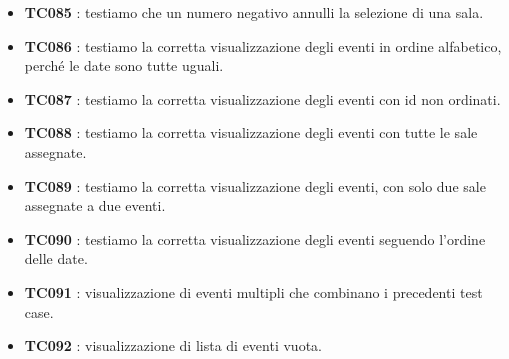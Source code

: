 \documentclass[11pt]{scrartcl} %
\begin{document}
\begin{itemize}


	\item \textbf{TC085} : testiamo che un numero negativo annulli la selezione di una sala.

	\item \textbf{TC086} : testiamo la corretta visualizzazione degli eventi in ordine alfabetico, perché le date sono tutte uguali.

	\item \textbf{TC087} : testiamo la corretta visualizzazione degli eventi con id non ordinati.

	\item \textbf{TC088} : testiamo la corretta visualizzazione degli eventi con tutte le sale assegnate.

	\item \textbf{TC089} : testiamo la corretta visualizzazione degli eventi, con solo due sale assegnate a due eventi.

	\item \textbf{TC090} : testiamo la corretta visualizzazione degli eventi seguendo l'ordine delle date.

	\item \textbf{TC091} : visualizzazione di eventi multipli che combinano i precedenti test case.

	\item \textbf{TC092} : visualizzazione di lista di eventi vuota.
\end{itemize}

\end{document}
